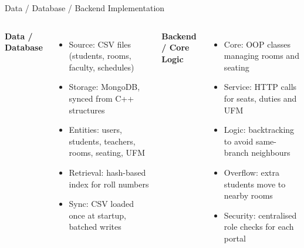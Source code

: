 \documentclass[aspectratio=169,11pt]{beamer}
\begin{document}
\begin{frame}{Data / Database / Backend Implementation}

\begin{columns}[T,totalwidth=\textwidth]


\textbf{\color{GEUBlue}Data / Database}

\begin{itemize}\itemsep3pt
    \small
    \item Source: CSV files (students, rooms, faculty, schedules)
    \item Storage: MongoDB, synced from C++ structures
    \item Entities: users, students, teachers, rooms, seating, UFM
    \item Retrieval: hash-based index for roll numbers
    \item Sync: CSV loaded once at startup, batched writes
\end{itemize}


\textbf{\color{GEUBlue}Backend / Core Logic}

\begin{itemize}\itemsep3pt
    \small
    \item Core: OOP classes managing rooms and seating
    \item Service: HTTP calls for seats, duties and UFM
    \item Logic: backtracking to avoid same-branch neighbours
    \item Overflow: extra students move to nearby rooms
    \item Security: centralised role checks for each portal
\end{itemize}

\end{columns}

\end{frame}
\end{document}
